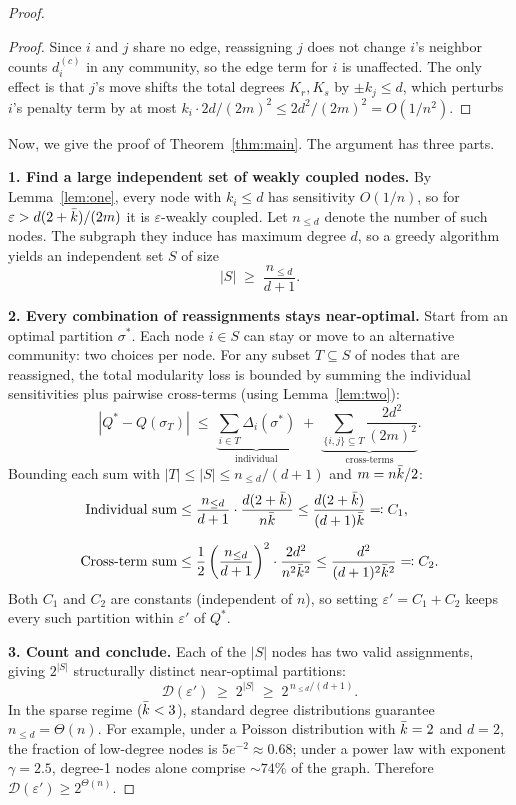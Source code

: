 \begin{proof}
\begin{proof}
Since $i$ and $j$ share no edge, reassigning $j$ does not change $i$'s neighbor counts $d_i^{(c)}$ in any community, so the edge term for $i$ is unaffected. The only effect is that $j$'s move shifts the total degrees $K_r, K_s$ by $\pm k_j \leq d$, which perturbs $i$'s penalty term by at most $k_i \cdot 2d/(2m)^2 \leq 2d^2/(2m)^2 = O(1/n^2)$.
\end{proof}

\noindent Now, we give the proof of Theorem~\ref{thm:main}. The argument has three parts.

\medskip
\noindent\textbf{1. Find a large independent set of weakly coupled nodes.}
By Lemma~\ref{lem:one}, every node with $k_i \leq d$ has sensitivity $O(1/n)$, so for $\varepsilon > d(2+\bar{k})/(2m)$ it is $\varepsilon$-weakly coupled. Let $n_{\le d}$ denote the number of such nodes. The subgraph they induce has maximum degree $d$, so a greedy algorithm yields an independent set $S$ of size
\[
|S| \;\geq\; \frac{n_{\le d}}{d+1}.
\]

\medskip
\noindent\textbf{2. Every combination of reassignments stays near-optimal.}
Start from an optimal partition $\sigma^*$. Each node $i \in S$ can stay or move to an alternative community: two choices per node. For any subset $T \subseteq S$ of nodes that are reassigned, the total modularity loss is bounded by summing the individual sensitivities plus pairwise cross-terms (using Lemma~\ref{lem:two}):
\[
|Q^* - Q(\sigma_T)| \;\leq\; \underbrace{\sum_{i \in T} \Delta_i(\sigma^*)}_{\text{individual}} \;+\; \underbrace{\sum_{\{i,j\} \subseteq T} \frac{2d^2}{(2m)^2}}_{\text{cross-terms}}.
\]
Bounding each sum with $|T| \leq |S| \leq n_{\le d}/(d+1)$ and $m = n\bar{k}/2$:
\begin{align*}
\text{Individual sum} &\leq \frac{n_{\le d}}{d+1} \cdot \frac{d(2+\bar{k})}{n\bar{k}} \leq \frac{d(2+\bar{k})}{(d+1)\bar{k}} \eqqcolon C_1, \\[6pt]
\text{Cross-term sum} &\leq \frac{1}{2}\left(\frac{n_{\le d}}{d+1}\right)^{2} \cdot \frac{2d^2}{n^2\bar{k}^2} \leq \frac{d^2}{(d+1)^2\bar{k}^2} \eqqcolon C_2.
\end{align*}
Both $C_1$ and $C_2$ are constants (independent of $n$), so setting $\varepsilon' = C_1 + C_2$ keeps every such partition within $\varepsilon'$ of $Q^*$.

\medskip
\noindent\textbf{3. Count and conclude.}
Each of the $|S|$ nodes has two valid assignments, giving $2^{|S|}$ structurally distinct near-optimal partitions:
\[
\mathcal{D}(\varepsilon') \;\geq\; 2^{|S|} \;\geq\; 2^{\,n_{\le d}/(d+1)}.
\]
In the sparse regime ($\bar{k} < 3$), standard degree distributions guarantee $n_{\le d} = \Theta(n)$. For example, under a Poisson distribution with $\bar{k} = 2$ and $d = 2$, the fraction of low-degree nodes is $5e^{-2} \approx 0.68$; under a power law with exponent $\gamma = 2.5$, degree-1 nodes alone comprise ${\sim}74\%$ of the graph. Therefore $\mathcal{D}(\varepsilon') \geq 2^{\Theta(n)}$.
\end{proof}

